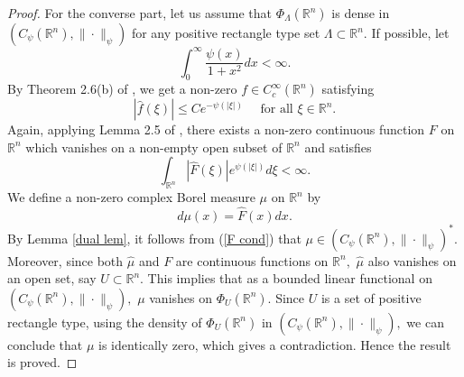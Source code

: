 \documentclass [11pt]{amsart}
\newcommand{\R}{\mathbb R}
\newcommand{\be} {\begin{equation}}
\newcommand{\ee} {\end{equation}}
\newcommand{\bes} {\begin{equation*}}
\newcommand{\ees} {\end{equation*}}
\numberwithin{equation}{section}
\begin{document}
\begin{proof}
For the converse part, let us assume that $\Phi_{\Lambda}(\R^n)$ is dense in $(C_{\psi}(\R^n),\|\cdot \|_{\psi})$ for any positive rectangle type set $\Lambda \subset \R^n.$ If possible, let $$\int_0^{\infty}\dfrac{\psi(x)}{1+x^2}dx<\infty.$$ By Theorem 2.6(b) of \cite{BRS}, we get a non-zero $f\in C_c^\infty(\R^n)$ satisfying $$|\widehat{f}(\xi)|\leq Ce^{-\psi(|\xi|)}\quad  \text{ for all } \xi\in \R^n.$$
Again, applying Lemma 2.5 of \cite{BRS}, there exists a non-zero continuous function $F$ on $\R^n$ which vanishes on a non-empty open subset of $\R^n$ and satisfies
\be\label{F cond}
\int_{\R^n}|\widehat{F}(\xi)|e^{\psi(|\xi|)}d\xi<\infty.\ee
We define a non-zero complex Borel measure $\mu$ on $\R^n$ by 
\bes \label{mu} d\mu(x)=\widehat{F}(x)dx. \ees 
By Lemma \ref{dual lem}, it follows from (\ref{F cond}) that $\mu\in (C_\psi(\R^n),\|\cdot\|_\psi)^*.$ Moreover, since both $\widehat{\mu}$ and $F$ are continuous functions on $\R^n,$ $\widehat{\mu}$ also vanishes on an open set, say $U \subset \R^n.$
This implies that as a bounded linear functional on $(C_\psi(\R^n),\|\cdot\|_\psi),$ $\mu$ vanishes on $\Phi_U(\R^n).$ Since $U$ is a set of positive rectangle type, using the density of  $\Phi_U(\R^n)$ in $(C_\psi(\R^n),\|\cdot\|_\psi),$ we can conclude that $\mu$ is identically zero, which gives a contradiction. Hence the result is proved.
\end{proof}
 
\end{document}
